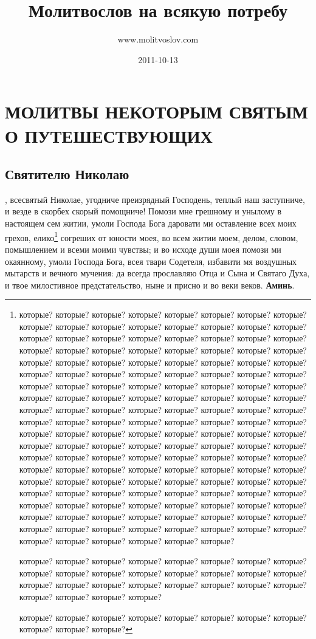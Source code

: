 \documentclass{book}
\title{Молитвослов на всякую потребу}
\author{www.molitvoslov.com}
\date{2011-10-13}
\newcommand{\mypart}[1]{
    \part{#1}
}
\newcommand{\mychapter}[1]{
    \chapter{#1}
}
\newenvironment{mymulticols}[1]{}{}
\begin{document}


\mypart{МОЛИТВЫ НЕКОТОРЫМ СВЯТЫМ О ПУТЕШЕСТВУЮЩИХ}\label{_content_svyatim-oputeshestvuyuchih}

\mychapter{Святителю Николаю}\begin{mymulticols}
 
О, всесвятый Николае, угодниче преизрядный Господень, теплый наш заступниче, и везде в скорбех скорый помощниче! Помози мне грешному и унылому в настоящем сем житии, умоли Господа Бога даровати ми оставление всех моих грехов, елико\footnote{которые? которые? которые? которые? которые? которые? которые? которые? которые? которые? которые? которые? которые? которые? которые? которые? которые? которые? которые? которые? которые? которые? которые? которые? которые? которые? которые? которые? которые? которые? которые? которые? которые? которые? которые? которые? которые? которые? которые? которые? которые? которые? которые? которые? которые? которые? которые? которые? которые? которые? которые? которые? которые? которые? которые? которые? которые? которые? которые? которые? которые? которые? которые? которые? которые? которые? которые? которые? которые? которые? которые? которые? которые? которые? которые? которые? которые? которые? которые? которые? которые? которые? которые? которые? которые? которые? которые? которые? которые? которые? которые? которые? которые? которые? которые? которые? которые? которые? которые? которые? которые? которые? которые? которые? которые? которые? которые? которые? которые? которые? которые? которые? которые? которые? которые? которые? которые? которые? которые? которые? которые? которые? которые? которые? которые? которые? которые? которые? которые? которые? которые? которые? которые? которые? которые? которые? которые? которые? которые? которые? которые? которые? которые? которые? которые? которые? которые? которые? которые? которые? которые? которые? которые? которые? которые? которые? которые? которые?

 которые? которые? которые? которые? которые? которые? которые? которые? которые? которые? которые? которые? которые? которые? которые? которые? которые? которые? которые? которые? которые? которые? которые? которые? которые? которые? которые? которые?
 
  которые? которые? которые? которые? которые? которые? которые? которые? которые? которые? которые?} согреших от юности моея, во всем житии моем, делом, словом, помышлением и всеми моими чувствы; и во исходе души моея помози ми окаянному, умоли Господа Бога, всея твари Содетеля, избавити мя воздушных мытарств и вечного мучения: да всегда прославляю Отца и Сына и Святаго Духа, и твое милостивное предстательство, ныне и присно и во веки веков. \textbf{Аминь}.


\end{mymulticols}
\end{document}
